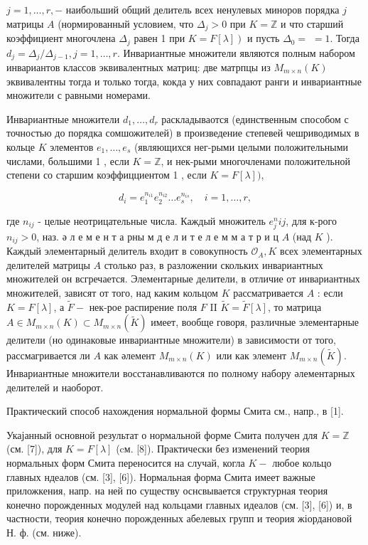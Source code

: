 \documentclass[10pt]{article}
\begin{document}
$j=1, \ldots, r,-$ наибольший общий делитель всех ненулевых миноров порядка $j$ матрицы $A$ (нормированный условием, что $\Delta_{j}>0$ при $K=\mathbb{Z}$ и что старший коэффициент многочлена $\Delta_{j}$ равен 1 при $\left.K=F[\lambda]\right)$ и пусть $\Delta_{0}=$ $=1$. Тогда $d_{j}=\Delta_{j} / \Delta_{j-1}, j=1, \ldots, r$. Инвариантные множители являются полным набором инвариантов классов эквивалентных матриц: две матрпцы из $M_{m \times n}(K)$ эквивалентны тогда и только тогда, кокда у них совпадают ранги и инвариантные множители с равными номерами.



Инвариантные множители $d_{1}, \ldots, d_{r}$ раскладываотся (единственным способом с точностью до порядка сомшожителей) в произведение степевей чешриводимых в кольце $K$ элементов $e_{1}, \ldots, e_{s}$ (являющихся нег-рыми целыми положительными числами, большими 1 , если $K=\mathbb{Z}$, и нек-рыми многочленами положительной степени со старшим коэффицциентом 1 , если $K=F[\lambda])$,



\[

d_{i}=e_{1}^{n_{i 1}} e_{2}^{n_{i 2}} \ldots e_{s}^{n_{i s}}, \quad i=1, \ldots, r,

\]



где $n_{i j}$ - целые неотрицательные числа. Каждый множитель $e_{j}^{n} i j$, для к-рого $n_{i j}>0$, наз. ә л е м е н т а рны м д е л и т е л е м м а т р и ц $A$ (над $K$ ). Каждый элементарный делитель входит в совокупность $\mathcal{O}_{A}, K$ всех элементарных делителей матрицы $A$ столько раз, в разложении скольких инвариантных множителей он всгречается. Элементарные делители, в отличие от инвариантных множителей, зависят от того, над каким кольцом $K$ рассматривается $A$ : если $K=F[\lambda]$, а $\tilde{F}-$ нек-рое распирение поля $F$ II $\tilde{K}=\tilde{F}[\lambda]$, то матрица $A \in M_{m \times n}(K) \subset M_{m \times n}(\tilde{K})$ имеет, вообще говоря, различные элементарные делители (но одинаковые инвариантные множители) в зависимости от того, рассмагривается ли $A$ как әлемент $M_{m \times n}(K)$ или как элемент $M_{m \times n}(\tilde{K})$. Инвариантные множители восстанавливаются по полному набору әлементарных делителей и наоборот.



Практический способ нахождения нормальной формы Смита см., напр., в [1].



Укајанный основной результат о нормальной форме Смита получен для $K=\mathbb{Z}$ (см. [7]), для $K=F[\lambda]$ (cм. [8]). Практически без изменений теория нормальных форм Смита переносится на случай, когла $K-$ любое кольцо главных ндеалов (см. [3], [6]). Нормальная форма Смита имеет важные приложкения, напр. на ней по существу оснсвывается структурная теория конечно порожденных модулей над кольцами главных идеалов (см. [3], [6]) и, в частности, теория конечно порожденных абелевых групп и теория жіордановой Н. ф. (см. ниже).
\end{document}
